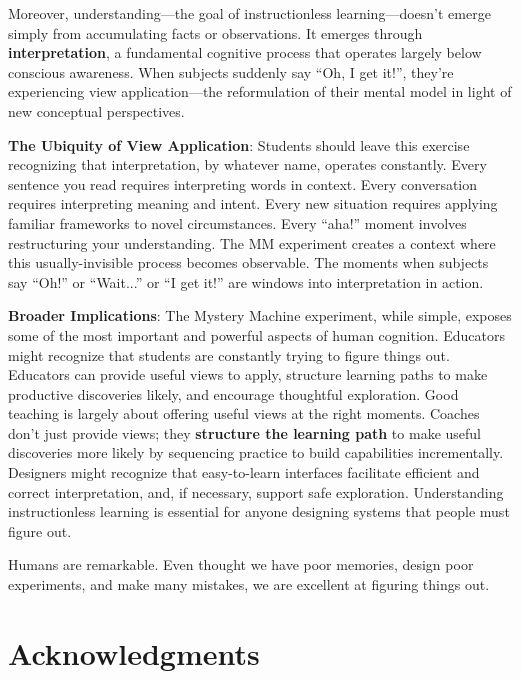 \documentclass[12pt,letterpaper]{article}
\begin{document}
Moreover, understanding—the goal of instructionless learning—doesn't emerge simply from accumulating facts or observations. It emerges through \textbf{interpretation}, a fundamental cognitive process that operates largely below conscious awareness. When subjects suddenly say ``Oh, I get it!'', they're experiencing view application—the reformulation of their mental model in light of new conceptual perspectives.

\textbf{The Ubiquity of View Application}: Students should leave this exercise recognizing that interpretation, by whatever name, operates constantly. Every sentence you read requires interpreting words in context. Every conversation requires interpreting meaning and intent. Every new situation requires applying familiar frameworks to novel circumstances. Every ``aha!'' moment involves restructuring your understanding. The MM experiment creates a context where this usually-invisible process becomes observable. The moments when subjects say ``Oh!'' or ``Wait...'' or ``I get it!'' are windows into interpretation in action.

\textbf{Broader Implications}: The Mystery Machine experiment, while simple, exposes some of the most important and powerful aspects of human cognition. Educators might recognize that students are constantly trying to figure things out. Educators can provide useful views to apply, structure learning paths to make productive discoveries likely, and encourage thoughtful exploration. Good teaching is largely about offering useful views at the right moments. Coaches don't just provide views; they \textbf{structure the learning path} to make useful discoveries more likely by sequencing practice to build capabilities incrementally. Designers might recognize that easy-to-learn  interfaces facilitate efficient and correct interpretation, and, if necessary, support safe exploration. Understanding instructionless learning is essential for anyone designing systems that people must figure out.

Humans are remarkable. Even thought we have poor memories, design poor experiments, and make many mistakes, we are excellent at figuring things out. 

\section*{Acknowledgments}



\end{document}
